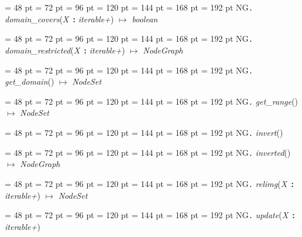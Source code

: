 {{{{\par \noindent  \leftskip = 48 pt  \leftmargini = 72 pt  \leftmarginii = 96 pt  \leftmarginiii = 120 pt  \leftmarginiv = 144 pt  \leftmarginv = 168 pt  \leftmarginvi = 192 pt NG{\large {\tt .\/} {\em domain{\_}covers\/}}({\em X\/}~{\bf :}  {\em iterable+\/}) \(\mapsto \)  {\em boolean\/}\par}
{\par \noindent  \leftskip = 48 pt  \leftmargini = 72 pt  \leftmarginii = 96 pt  \leftmarginiii = 120 pt  \leftmarginiv = 144 pt  \leftmarginv = 168 pt  \leftmarginvi = 192 pt NG{\large {\tt .\/} {\em domain{\_}restricted\/}}({\em X\/}~{\bf :}  {\em iterable+\/}) \(\mapsto \)  {\em NodeGraph\/}\par}
{\par \noindent  \leftskip = 48 pt  \leftmargini = 72 pt  \leftmarginii = 96 pt  \leftmarginiii = 120 pt  \leftmarginiv = 144 pt  \leftmarginv = 168 pt  \leftmarginvi = 192 pt NG{\large {\tt .\/} {\em get{\_}domain\/}}() \(\mapsto \)  {\em NodeSet\/}\par}
{\par \noindent  \leftskip = 48 pt  \leftmargini = 72 pt  \leftmarginii = 96 pt  \leftmarginiii = 120 pt  \leftmarginiv = 144 pt  \leftmarginv = 168 pt  \leftmarginvi = 192 pt NG{\large {\tt .\/} {\em get{\_}range\/}}() \(\mapsto \)  {\em NodeSet\/}\par}
{\par \noindent  \leftskip = 48 pt  \leftmargini = 72 pt  \leftmarginii = 96 pt  \leftmarginiii = 120 pt  \leftmarginiv = 144 pt  \leftmarginv = 168 pt  \leftmarginvi = 192 pt NG{\large {\tt .\/} {\em invert\/}}()\par}
{\par \noindent  \leftskip = 48 pt  \leftmargini = 72 pt  \leftmarginii = 96 pt  \leftmarginiii = 120 pt  \leftmarginiv = 144 pt  \leftmarginv = 168 pt  \leftmarginvi = 192 pt NG{\large {\tt .\/} {\em inverted\/}}() \(\mapsto \)  {\em NodeGraph\/}\par}
{\par \noindent  \leftskip = 48 pt  \leftmargini = 72 pt  \leftmarginii = 96 pt  \leftmarginiii = 120 pt  \leftmarginiv = 144 pt  \leftmarginv = 168 pt  \leftmarginvi = 192 pt NG{\large {\tt .\/} {\em relimg\/}}({\em X\/}~{\bf :}  {\em iterable+\/}) \(\mapsto \)  {\em NodeSet\/}\par}
{\par \noindent  \leftskip = 48 pt  \leftmargini = 72 pt  \leftmarginii = 96 pt  \leftmarginiii = 120 pt  \leftmarginiv = 144 pt  \leftmarginv = 168 pt  \leftmarginvi = 192 pt NG{\large {\tt .\/} {\em update\/}}({\em X\/}~{\bf :}  {\em iterable+\/})\par}
}}}
